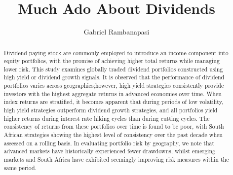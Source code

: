 \documentclass[12pt,preprint, authoryear]{elsarticle}
\numberwithin{equation}{section}
\numberwithin{figure}{section}
\numberwithin{table}{section}
\begin{document}
\begin{frontmatter}  %

\title{Much Ado About Dividends}





\author[Add1]{Gabriel Rambanapasi}





\address[Add1]{Stellenbosch University, Cape Town, South Africa}


\begin{abstract}
\small{
Dividend paying stock are commonly employed to introduce an income
component into equity portfolios, with the promise of achieving higher
total returns while managing lower risk. This study examines globally
traded dividend portfolios constructed using high yield or dividend
growth signals. It is observed that the performance of dividend
portfolios varies across geographies;however, high yield strategies
consistently provide investors with the highest aggregate returns in
advanced economies over time. When index returns are stratified, it
becomes apparent that during periods of low volatility, high yield
strategies outperform dividend growth strategies, and all portfolios
yield higher returns during interest rate hiking cycles than during
cutting cycles. The consistency of returns from these portfolios over
time is found to be poor, with South African strategies showing the
highest level of consistency over the past decade when assessed on a
rolling basis. In evaluating portfolio risk by geography, we note that
advanced markets have historically experienced fewer drawdowns, whilst
emerging markets and South Africa have exhibited seemingly improving
risk measures within the same period.
}
\end{abstract}

\vspace{1cm}





\vspace{0.5cm}

\end{frontmatter}

\setcounter{footnote}{0}



\pagestyle{fancy}
\chead{}
\rhead{}
\lfoot{}
\lhead{}
\cfoot{}
\end{document}
